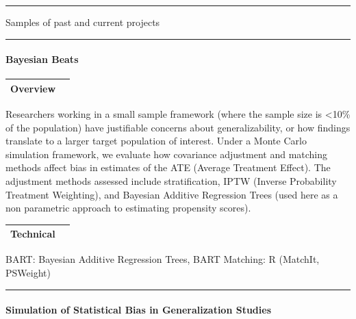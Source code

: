 \documentclass[
]{article}
\author{}
\date{\vspace{-2.5em}}
\begin{document}
{
\setcounter{tocdepth}{3}
\tableofcontents
}
\begin{center}\rule{0.5\linewidth}{0.5pt}\end{center}

Samples of past and current projects

\begin{center}\rule{0.5\linewidth}{0.5pt}\end{center}

\hypertarget{bayesian-beats}{%
\paragraph{Bayesian Beats}\label{bayesian-beats}}

\begin{longtable}[]{@{}lr@{}}
\toprule
Overview & \\
\midrule
\endhead
\bottomrule
\end{longtable}

Researchers working in a small sample framework (where the sample size
is \textless10\% of the population) have justifiable concerns about
generalizability, or how findings translate to a larger target
population of interest. Under a Monte Carlo simulation framework, we
evaluate how covariance adjustment and matching methods affect bias in
estimates of the ATE (Average Treatment Effect). The adjustment methods
assessed include stratification, IPTW (Inverse Probability Treatment
Weighting), and Bayesian Additive Regression Trees (used here as a non
parametric approach to estimating propensity scores).

\begin{longtable}[]{@{}lr@{}}
\toprule
Technical & \\
\midrule
\endhead
\bottomrule
\end{longtable}

BART: Bayesian Additive Regression Trees, BART Matching: R (MatchIt,
PSWeight)

\begin{center}\rule{0.5\linewidth}{0.5pt}\end{center}

\hypertarget{simulation-of-statistical-bias-in-generalization-studies}{%
\paragraph{Simulation of Statistical Bias in Generalization
Studies}\label{simulation-of-statistical-bias-in-generalization-studies}}
\end{document}
